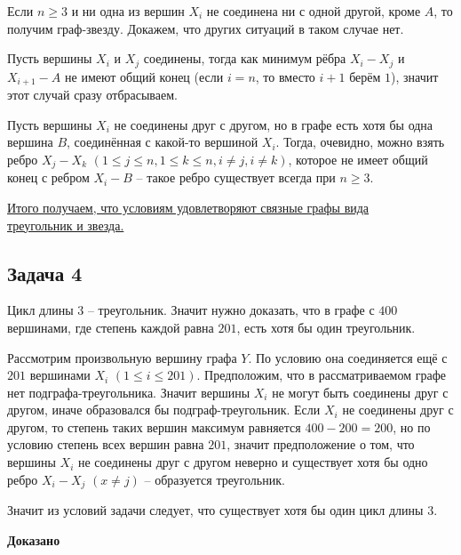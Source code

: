 \documentclass[a4paper,14pt]{article} %
\begin{document}
Если $n \geqslant 3$ и ни одна из вершин $X_i$ не соединена ни с одной другой, кроме $A$, то получим граф-звезду. Докажем, что других ситуаций в таком случае нет.

Пусть вершины $X_i$ и $X_j$ соединены, тогда как минимум рёбра $X_i-X_j$ и $X_{i+1}-A$ не имеют общий конец (если $i = n$, то вместо $i+1$ берём $1$), значит этот случай сразу отбрасываем.

Пусть вершины $X_i$ не соединены друг с другом, но в графе есть хотя бы одна вершина $B$, соединённая с какой-то вершиной $X_i$. Тогда, очевидно, можно взять ребро $X_j-X_k$ $(1 \leqslant j \leqslant n, 1 \leqslant k \leqslant n, i \neq j, i \neq k)$, которое не имеет общий конец с ребром $X_i-B$ -- такое ребро существует всегда при $n \geqslant 3$.

\underline{Итого получаем, что условиям удовлетворяют связные графы вида}\\ \underline{треугольник и звезда.}


\newpage
\begin{center}
\subsection{Задача 4}
\end{center}

Цикл длины $3$ -- треугольник. Значит нужно доказать, что в графе с $400$ вершинами, где степень каждой равна $201$, есть хотя бы один треугольник.

Рассмотрим произвольную вершину графа $Y$. По условию она соединяется ещё с $201$ вершинами $X_i$ $(1 \leqslant i \leqslant 201)$. Предположим, что в рассматриваемом графе нет подграфа-треугольника. Значит вершины $X_i$ не могут быть соединены друг с другом, иначе образовался бы подграф-треугольник. Если $X_i$ не соединены друг с другом, то степень таких вершин максимум равняется $400-200 = 200$, но по условию степень всех вершин равна $201$, значит предположение о том, что вершины $X_i$ не соединены друг с другом неверно и существует хотя бы одно ребро $X_i-X_j$ $(x \neq j)$ -- образуется треугольник.

Значит из условий задачи следует, что существует хотя бы один цикл длины $3$.

\begin{flushright}
\begin{large}
\textbf {Доказано}
\end{large}
\end{flushright}
\end{document}

